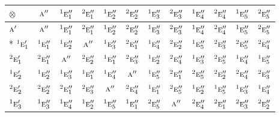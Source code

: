\documentclass[10pt,a4paper]{article}
\numberwithin{equation}{section}
\newcommand{\irr}[1]{\text{\normalfont\scshape #1}}
\newcommand{\conjpair}[1]{{}^{#1}}
\newcommand{\irrprod}{\otimes}
\begin{document}
{\small\setlength{\tabcolsep}{3pt}\begin{longtable}{@{}lccccccccccc@{}}\toprule
$\irrprod$ & $\irr{a}''$ & $\conjpair{1}\irr{e}_{1}''$ & $\conjpair{2}\irr{e}_{1}''$ & $\conjpair{1}\irr{e}_{2}''$ & $\conjpair{2}\irr{e}_{2}''$ & $\conjpair{1}\irr{e}_{3}''$ & $\conjpair{2}\irr{e}_{3}''$ & $\conjpair{1}\irr{e}_{4}''$ & $\conjpair{2}\irr{e}_{4}''$ & $\conjpair{1}\irr{e}_{5}''$ & $\conjpair{2}\irr{e}_{5}''$\\\midrule\endhead
\bottomrule\endfoot\endlastfoot
$\irr{a}'$ & $\irr{a}''$ & $\conjpair{1}\irr{e}_{1}''$ & $\conjpair{2}\irr{e}_{1}''$ & $\conjpair{1}\irr{e}_{2}''$ & $\conjpair{2}\irr{e}_{2}''$ & $\conjpair{1}\irr{e}_{3}''$ & $\conjpair{2}\irr{e}_{3}''$ & $\conjpair{1}\irr{e}_{4}''$ & $\conjpair{2}\irr{e}_{4}''$ & $\conjpair{1}\irr{e}_{5}''$ & $\conjpair{2}\irr{e}_{5}''$\\*
$\conjpair{1}\irr{e}_{1}'$ & $\conjpair{1}\irr{e}_{1}''$ & $\conjpair{1}\irr{e}_{2}''$ & $\irr{a}''$ & $\conjpair{1}\irr{e}_{3}''$ & $\conjpair{2}\irr{e}_{1}''$ & $\conjpair{1}\irr{e}_{4}''$ & $\conjpair{2}\irr{e}_{2}''$ & $\conjpair{1}\irr{e}_{5}''$ & $\conjpair{2}\irr{e}_{3}''$ & $\conjpair{2}\irr{e}_{5}''$ & $\conjpair{2}\irr{e}_{4}''$\\
$\conjpair{2}\irr{e}_{1}'$ & $\conjpair{2}\irr{e}_{1}''$ & $\irr{a}''$ & $\conjpair{2}\irr{e}_{2}''$ & $\conjpair{1}\irr{e}_{1}''$ & $\conjpair{2}\irr{e}_{3}''$ & $\conjpair{1}\irr{e}_{2}''$ & $\conjpair{2}\irr{e}_{4}''$ & $\conjpair{1}\irr{e}_{3}''$ & $\conjpair{2}\irr{e}_{5}''$ & $\conjpair{1}\irr{e}_{4}''$ & $\conjpair{1}\irr{e}_{5}''$\\
$\conjpair{1}\irr{e}_{2}'$ & $\conjpair{1}\irr{e}_{2}''$ & $\conjpair{1}\irr{e}_{3}''$ & $\conjpair{1}\irr{e}_{1}''$ & $\conjpair{1}\irr{e}_{4}''$ & $\irr{a}''$ & $\conjpair{1}\irr{e}_{5}''$ & $\conjpair{2}\irr{e}_{1}''$ & $\conjpair{2}\irr{e}_{5}''$ & $\conjpair{2}\irr{e}_{2}''$ & $\conjpair{2}\irr{e}_{4}''$ & $\conjpair{2}\irr{e}_{3}''$\\
$\conjpair{2}\irr{e}_{2}'$ & $\conjpair{2}\irr{e}_{2}''$ & $\conjpair{2}\irr{e}_{1}''$ & $\conjpair{2}\irr{e}_{3}''$ & $\irr{a}''$ & $\conjpair{2}\irr{e}_{4}''$ & $\conjpair{1}\irr{e}_{1}''$ & $\conjpair{2}\irr{e}_{5}''$ & $\conjpair{1}\irr{e}_{2}''$ & $\conjpair{1}\irr{e}_{5}''$ & $\conjpair{1}\irr{e}_{3}''$ & $\conjpair{1}\irr{e}_{4}''$\\
$\conjpair{1}\irr{e}_{3}'$ & $\conjpair{1}\irr{e}_{3}''$ & $\conjpair{1}\irr{e}_{4}''$ & $\conjpair{1}\irr{e}_{2}''$ & $\conjpair{1}\irr{e}_{5}''$ & $\conjpair{1}\irr{e}_{1}''$ & $\conjpair{2}\irr{e}_{5}''$ & $\irr{a}''$ & $\conjpair{2}\irr{e}_{4}''$ & $\conjpair{2}\irr{e}_{1}''$ & $\conjpair{2}\irr{e}_{3}''$ & $\conjpair{2}\irr{e}_{2}''$\\

\end{longtable}}
\end{document}
